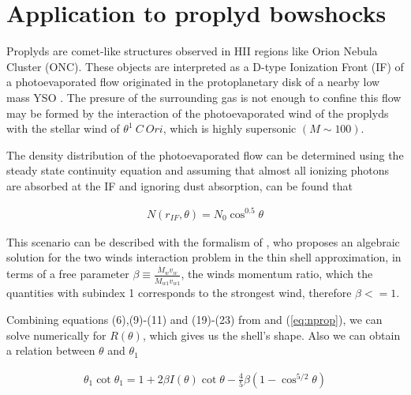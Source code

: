 \section{Application to proplyd bowshocks}
\label{sec:application}

Proplyds are comet-like structures observed in HII regions like Orion Nebula Cluster (ONC). 
These objects are interpreted as a D-type Ionization Front (IF) of a photoevaporated flow 
originated in the protoplanetary disk of a nearby low mass YSO \citep{Johnstone:1998}.
The presure of the surrounding gas is not enough to confine this flow \citep{HA:1998}
may be formed by the interaction of the photoevaporated wind of the proplyds with the stellar wind of $\theta^1~C~Ori$, which is highly supersonic $(M \sim 100)$. 

The density distribution of the photoevaporated flow can be determined using the steady state continuity equation and assuming that almost all ionizing photons are absorbed at the IF \citep{HA:1998} and ignoring dust absorption, can be found that

\begin{align}
N(r_{IF},\theta) = N_0 \cos^{0.5}\theta
\label{eq:nprop}
\end{align}

This scenario can be described with the formalism of \citep{Canto:1996}, who proposes an algebraic solution for the two winds interaction problem in the thin shell approximation, in terms of a free parameter $\beta\equiv\frac{\dot{M}_wv_w}{\dot{M}_{w1}v_{w1}}$,
the winds momentum ratio, which the quantities with subindex 1 corresponds to the strongest wind, therefore $\beta<=1$. 


 Combining equations (6),(9)-(11) and (19)-(23) from \citep{Canto:1996} and (\ref{eq:nprop}), we can solve numerically for $R(\theta)$, which gives us the shell's shape. Also we can
obtain a relation between $\theta$ and $\theta_1$

\begin{align}
\theta_1\cot\theta_1 = 1+ 2\beta I(\theta)\cot\theta - \frac{4}{5}\beta\left(1-\cos^{5/2}\theta\right)
\label{eq:th1th}
\end{align}


